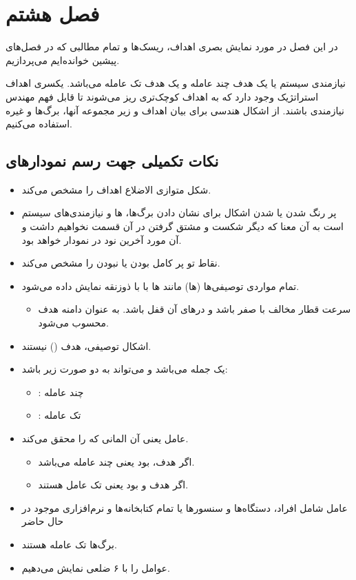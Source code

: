 \newpage

\section{فصل هشتم}

در این فصل در مورد نمایش بصری اهداف، ریسک‌ها و تمام مطالبی که در فصل‌های پیشین
خوانده‌ایم می‌پردازیم.

نیازمندی سیستم یا  یک هدف چند عامله و  یک هدف تک عامله می‌باشد. یکسری اهداف استراتژیک وجود دارد که به
اهداف کوچک‌تری ریز می‌شوند تا قابل فهم مهندس نیازمندی باشند. از اشکال هندسی برای
بیان اهداف و زیر مجموعه آنها، برگ‌ها و غیره استفاده می‌کنیم.


\subsection{نکات تکمیلی جهت رسم نمودار‌های }

\begin{itemize}
    \item شکل متوازی الاضلاع اهداف را مشخص می‌کند.
    \item پر رنگ شدن یا  شدن اشکال برای نشان دادن برگ‌ها،
    ها و نیازمندی‌های سیستم است به آن معنا که دیگر شکست و مشتق
    گرفتن در آن قسمت نخواهیم داشت و آن مورد آخرین نود در نمودار خواهد بود.
    \item نقاط تو پر کامل بودن یا نبودن را مشخص می‌کند.
    \item تمام مواردی توصیفی‌ها (ها) مانند  ها
    با با ذوزنقه نمایش داده می‌شود.
    \begin{itemize}
        \item سرعت قطار مخالف با صفر باشد و در‌های آن قفل باشد. به عنوان دامنه
        هدف محسوب می‌شود.
    \end{itemize}
    \item اشکال توصیفی، هدف () نیستند.
    \item {} یک جمله می‌باشد و می‌تواند به دو صورت زیر باشد:
    \begin{itemize}
        \item {}: چند عامله
        \item {}: تک عامله
    \end{itemize}
    \item عامل یعنی آن المانی که  را محقق می‌کند.
    \begin{itemize}
        \item اگر هدف،  بود یعنی چند عامله می‌باشد.
        \item اگر هدف  و  بود یعنی تک
        عامل هستند.
    \end{itemize}
    \item عامل شامل افراد، دستگاه‌ها و سنسور‌ها یا تمام کتابخانه‌ها و نرم‌افزاری
    موجود در حال حاضر
    \item برگ‌ها تک عامله هستند.
    \item عوامل را با ۶ ضلعی نمایش می‌دهیم.
\end{itemize}

